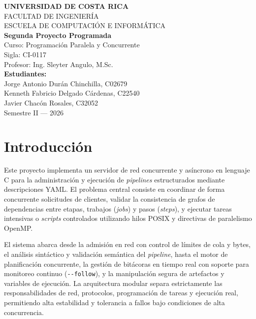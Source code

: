 \documentclass[12pt,a4paper]{article}
\newcommand{\code}[1]{\texttt{#1}}
\begin{document}
\begin{titlepage}
\centering
\vspace*{1cm}
{\Large\bfseries UNIVERSIDAD DE COSTA RICA}\\[0.6cm]
{\large FACULTAD DE INGENIERÍA}\\[0.3cm]
{\large ESCUELA DE COMPUTACIÓN E INFORMÁTICA}\\[2.5cm]

{\LARGE\bfseries Segunda Proyecto Programada}\\[1.5cm]

{\large Curso: Programación Paralela y Concurrente}\\[0.3cm]
{\large Sigla: CI-0117}\\[0.3cm]
{\large Profesor: Ing. Sleyter Angulo, M.Sc.}\\[2cm]

{\large\bfseries Estudiantes:}\\[0.4cm]
{\large Jorge Antonio Durán Chinchilla, C02679}\\
{\large Kenneth Fabricio Delgado Cárdenas, C22540}\\
{\large Javier Chacón Rosales, C32052}\\[2.5cm]

{\large Semestre II --- 2026}

\vfill
\end{titlepage}

\section{Introducción}

Este proyecto implementa un servidor de red concurrente y asíncrono en lenguaje C para la administración y ejecución de \textit{pipelines} estructurados mediante descripciones YAML. El problema central consiste en coordinar de forma concurrente solicitudes de clientes, validar la consistencia de grafos de dependencias entre etapas, trabajos (\textit{jobs}) y pasos (\textit{steps}), y ejecutar tareas intensivas o \textit{scripts} controlados utilizando hilos POSIX y directivas de paralelismo OpenMP.

El sistema abarca desde la admisión en red con control de límites de cola y bytes, el análisis sintáctico y validación semántica del \textit{pipeline}, hasta el motor de planificación concurrente, la gestión de bitácoras en tiempo real con soporte para monitoreo continuo (\code{-{}-follow}), y la manipulación segura de artefactos y variables de ejecución. La arquitectura modular separa estrictamente las responsabilidades de red, protocolos, programación de tareas y ejecución real, permitiendo alta estabilidad y tolerancia a fallos bajo condiciones de alta concurrencia.
\end{document}
